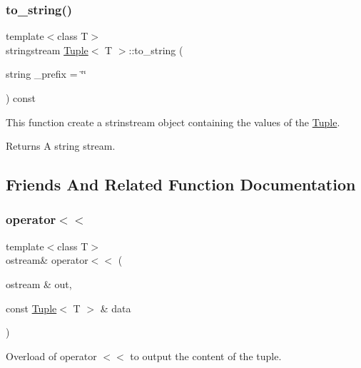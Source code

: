 \mbox{\label{class_tuple_a029b06891c82353ae40c13199830e90a}} 
\subsubsection{\texorpdfstring{to\_string()}{to\_string()}}
{\footnotesize\ttfamily template$<$class T$>$ \\
stringstream \mbox{\hyperlink{class_tuple}{Tuple}}$<$ T $>$\+::to\+\_\+string (\begin{DoxyParamCaption}\item[{string}]{\+\_\+prefix = {\ttfamily \char`\"{}\char`\"{}} }\end{DoxyParamCaption}) const\hspace{0.3cm}{\ttfamily [inline]}}

This function create a strinstream object containing the values of the \mbox{\hyperlink{class_tuple}{Tuple}}. \begin{DoxyReturn}{Returns}
A string stream. 
\end{DoxyReturn}


\subsection{Friends And Related Function Documentation}
\mbox{\label{class_tuple_a2e6e2a2521038ab827ff2aa73023a53d}} 
\subsubsection{\texorpdfstring{operator$<$$<$}{operator<<}}
{\footnotesize\ttfamily template$<$class T$>$ \\
ostream\& operator$<$$<$ (\begin{DoxyParamCaption}\item[{ostream \&}]{out,  }\item[{const \mbox{\hyperlink{class_tuple}{Tuple}}$<$ T $>$ \&}]{data }\end{DoxyParamCaption})\hspace{0.3cm}{\ttfamily [friend]}}



Overload of operator $<$$<$ to output the content of the tuple. 


